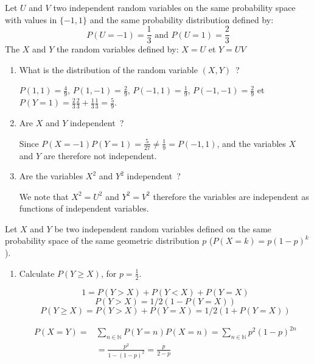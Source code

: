 \documentclass[a4paper,11pt]{exam}
\newcommand{\N}{\mathbb{N}}
\begin{document}
\begin{questions}
\question
Let $U$ and $V$ two independent random variables on the same probability space with values in $\{-1,1\}$ and the same probability distribution defined by:
\[
P(U=-1) = \frac{1}{3} \mbox{ and } P(U=1)= \frac{2}{3}
\]
The $X$ and $Y$ the random variables defined by: $X = U$ et
$Y = UV$
\begin{enumerate}
	\item What is the distribution of the random variable $(X,Y)$~?
	
	\begin{solution}
		$P(1,1) = \frac{4}{9}$,
		$P(1,-1) = \frac{2}{9}$,
		$P(-1,1) = \frac{1}{9}$,
		$P(-1,-1) = \frac{2}{9}$ et
		$P(Y=1) = \frac{2}{3}\frac{2}{3} + \frac{1}{3}\frac{1}{3} = \frac{5}{9}$.
	\end{solution}
	
	\item  Are $X$ and $Y$ independent~?
	
	\begin{solution}
		Since $P(X=-1)P(Y=1) = \frac{5}{27} \neq \frac{1}{9} = P(-1,1)$,
		and the variables $ X $ and $ Y $ are therefore not independent.
	\end{solution}
	
	\item Are the variables $X^2$ and $Y^2$ independent~?
	
	\begin{solution}
		We note that $X^2=U^2$ and $Y^2=V^2$ therefore the variables are independent as functions of independent variables.
	\end{solution}
\end{enumerate}

Let $ X $ and $ Y $ be two independent random variables defined on the same probability space of the same geometric distribution $p$  ($P(X = k) = p(1-p)^k$).
\begin{enumerate}
	
	\item Calculate $P(Y \geq X)$, for $p=\frac{1}{2}$.
	
	\begin{solution}
		\[
		1= P(Y > X)+P(Y < X)+P(Y = X)
		\]
		\[
		P(Y > X) = 1/2(1 -P(Y = X))
		\]		
		\[
		P(Y \geq X) = P(Y > X) + P(Y = X) =  1/2(1 +P(Y = X))
		\]
		
		
		
		\begin{align*}
		P(X=Y)=& \sum_{n\in\N }P(Y = n) P(X = n)
		= \sum_{n\in\N} p^2(1-p)^{2n}\\& =\frac{p^2}{1-(1-p)^2} = \frac{p}{2-p}
		\end{align*}
		

\end{solution}
\end{enumerate}
\end{questions}
\end{document}
